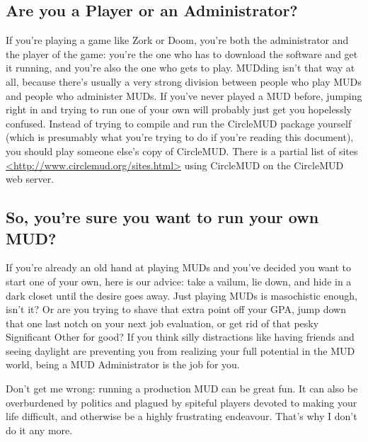 \documentclass[11pt]{article}
\begin{document}
\subsection{Are you a Player or an Administrator?}
If you're playing a game like Zork or Doom, you're both the administrator and the player of the game: you're the one who has to download the software and get it running, and you're also the one who gets to play. MUDding isn't that way at all, because there's usually a very strong division between people who play MUDs and people who administer MUDs. If you've never played a MUD before, jumping right in and trying to run one of your own will probably just get you hopelessly confused.  Instead of trying to compile and run the CircleMUD package yourself (which is presumably what you're trying to do if you're reading this document), you should play someone else's copy of CircleMUD.  There is a partial list of sites  \url{<http://www.circlemud.org/sites.html>} using CircleMUD on the CircleMUD web server.

\subsection{So, you're sure you want to run your own MUD?}
If you're already an old hand at playing MUDs and you've decided you want to start one of your own, here is our advice: take a vailum, lie down, and hide in a dark closet until the desire goes away.  Just playing MUDs is masochistic enough, isn't it?  Or are you trying to shave that extra point off your GPA, jump down that one last notch on your next job evaluation, or get rid of that pesky Significant Other for good?  If you think silly distractions like having friends and seeing daylight are preventing you from realizing your full potential in the MUD world, being a MUD Administrator is the job for you. 
\par
Don't get me wrong: running a production MUD can be great fun.  It can also be overburdened by politics and plagued by spiteful players devoted to making your life difficult, and otherwise be a highly frustrating endeavour.  That's why I don't do it any more. 
\end{document}
